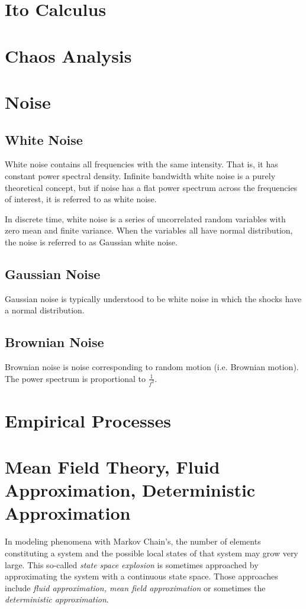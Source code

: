 \section{Ito Calculus}

\section{Chaos Analysis}

\section{Noise}

\subsection{White Noise}
White noise contains all frequencies with the same intensity. That is, it has constant power spectral density. Infinite bandwidth white noise is a purely theoretical concept, but if noise has a flat power spectrum across the frequencies of interest, it is referred to as white noise. 

In discrete time, white noise is a series of uncorrelated random variables with zero mean and finite variance. When the variables all have normal distribution, the noise is referred to as Gaussian white noise. 

\subsection{Gaussian Noise}
Gaussian noise is typically understood to be white noise in which the shocks have a normal distribution.

\subsection{Brownian Noise}
Brownian noise is noise corresponding to random motion (i.e. Brownian motion). The power spectrum is proportional to $\frac{1}{f^2}$.

\section{Empirical Processes}

\section{Mean Field Theory, Fluid Approximation, Deterministic Approximation}
In modeling phenomena with Markov Chain's, the number of elements constituting a system and the possible local states of that system may grow very large. This so-called \textit{state space explosion} is sometimes approached by approximating the system with a continuous state space. Those approaches include \textit{fluid approximation, mean field approximation} or sometimes the \textit{deterministic approximation}. 